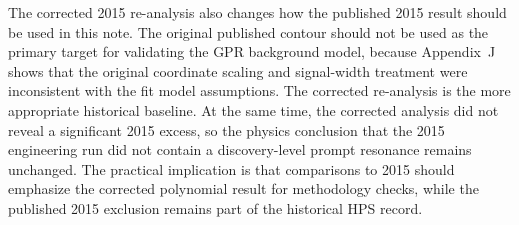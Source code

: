The corrected 2015 re-analysis also changes how the published 2015 result should be
used in this note.  The original published contour should not be used as the primary
target for validating the GPR background model, because Appendix~J shows that the
original coordinate scaling and signal-width treatment were inconsistent with the fit
model assumptions.  The corrected re-analysis is the more appropriate historical
baseline.  At the same time, the corrected analysis did not reveal a significant
2015 excess, so the physics conclusion that the 2015 engineering run did not contain a
discovery-level prompt resonance remains unchanged.  The practical implication is that
comparisons to 2015 should emphasize the corrected polynomial result for methodology
checks, while the published 2015 exclusion remains part of the historical HPS record.
